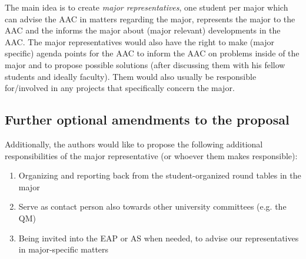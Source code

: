 The main idea is to create \emph{major representatives}, one student per major which can advise the AAC in matters regarding the major, represents the major to the AAC and the informs the major about (major relevant) developments in the AAC. 
The major representatives would also have the right to make (major specific) agenda points for the AAC to inform the AAC on problems inside of the major and to propose possible solutions (after discussing them with his fellow students and ideally faculty). Them would also usually be responsible for/involved  in any projects that specifically concern the major.

\subsection{Further optional amendments to the proposal}
Additionally, the authors would like to propose the following additional responsibilities of the major representative (or whoever them makes responsible):

\begin{enumerate}
	\item  {} \label{amend:1} Organizing and reporting back from the student-organized round tables in the major
	\item {} \label{amend:2} Serve as contact person also towards other university committees (e.g. the QM)
	\item {} \label{amend:3} Being invited into the EAP or AS when needed, to advise our representatives in major-specific matters
\end{enumerate}